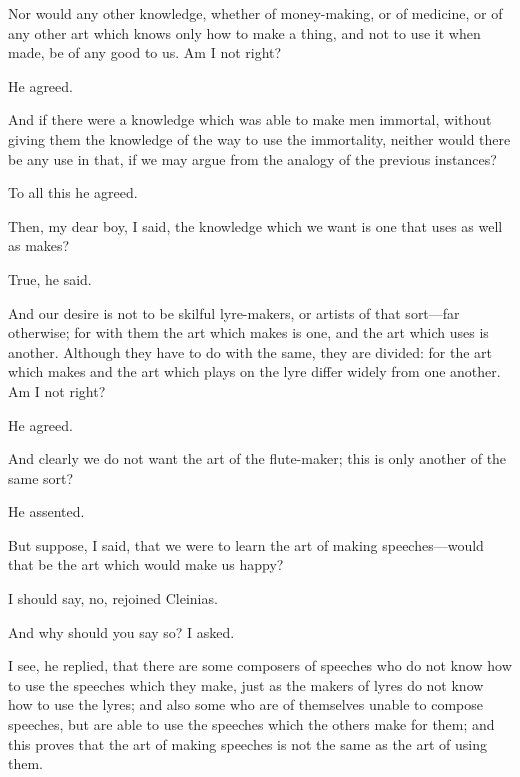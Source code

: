 \documentclass[11pt,letter]{article}
\begin{document}
\par  Nor would any other knowledge, whether of money-making, or of medicine, or of any other art which knows only how to make a thing, and not to use it when made, be of any good to us. Am I not right?

\par  He agreed.

\par  And if there were a knowledge which was able to make men immortal, without giving them the knowledge of the way to use the immortality, neither would there be any use in that, if we may argue from the analogy of the previous instances?

\par  To all this he agreed.

\par  Then, my dear boy, I said, the knowledge which we want is one that uses as well as makes?

\par  True, he said.

\par  And our desire is not to be skilful lyre-makers, or artists of that sort—far otherwise; for with them the art which makes is one, and the art which uses is another. Although they have to do with the same, they are divided: for the art which makes and the art which plays on the lyre differ widely from one another. Am I not right?

\par  He agreed.

\par  And clearly we do not want the art of the flute-maker; this is only another of the same sort?

\par  He assented.

\par  But suppose, I said, that we were to learn the art of making speeches—would that be the art which would make us happy?

\par  I should say, no, rejoined Cleinias.

\par  And why should you say so? I asked.

\par  I see, he replied, that there are some composers of speeches who do not know how to use the speeches which they make, just as the makers of lyres do not know how to use the lyres; and also some who are of themselves unable to compose speeches, but are able to use the speeches which the others make for them; and this proves that the art of making speeches is not the same as the art of using them.
\end{document}
